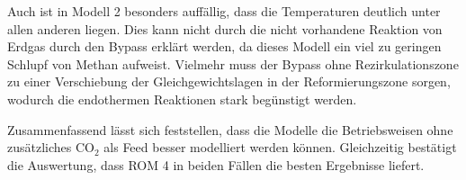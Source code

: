         Auch ist in Modell 2 besonders auffällig, dass die Temperaturen deutlich unter allen anderen liegen. Dies kann nicht durch die nicht vorhandene Reaktion von Erdgas durch den Bypass erklärt werden, da dieses Modell ein viel zu geringen Schlupf von Methan aufweist. \alert{Vielmehr muss der Bypass ohne Rezirkulationszone zu einer Verschiebung der Gleichgewichtslagen in der Reformierungszone sorgen, wodurch die endothermen Reaktionen stark begünstigt werden.}

        Zusammenfassend lässt sich feststellen, dass die Modelle die Betriebsweisen ohne zusätzliches CO$_2$ als Feed besser modelliert werden können. Gleichzeitig bestätigt die Auswertung, dass ROM 4 in beiden Fällen die besten Ergebnisse liefert. 
\fi